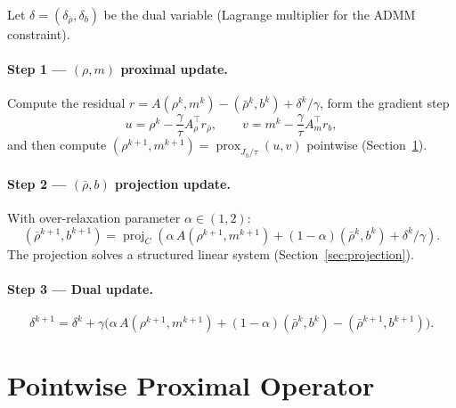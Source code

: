 \documentclass[11pt]{article}
\begin{document}
Let $\delta = (\delta_{\bar\rho}, \delta_b)$ be the dual variable (Lagrange
multiplier for the ADMM constraint).

\paragraph{Step 1 --- $(\rho,m)$ proximal update.}
Compute the residual
$r = A(\rho^k,m^k) - (\bar\rho^k, b^k) + \delta^k/\gamma$,
form the gradient step
\begin{equation}
  u = \rho^k - \frac{\gamma}{\tau}A_\rho^\top r_{\bar\rho}, \qquad
  v = m^k   - \frac{\gamma}{\tau}A_m^\top r_b,
\end{equation}
and then compute $(\rho^{k+1}, m^{k+1}) = \operatorname{prox}_{J_h/\tau}(u, v)$
pointwise (Section~\ref{sec:prox}).

\paragraph{Step 2 --- $(\bar\rho, b)$ projection update.}
With over-relaxation parameter $\alpha \in (1,2)$:
\begin{equation}
  (\bar\rho^{k+1}, b^{k+1})
  = \operatorname{proj}_C\!\left(
      \alpha\,A(\rho^{k+1},m^{k+1}) + (1-\alpha)(\bar\rho^k,b^k)
      + \delta^k/\gamma
    \right).
\end{equation}
The projection solves a structured linear system (Section~\ref{sec:projection}).

\paragraph{Step 3 --- Dual update.}
\begin{equation}
  \delta^{k+1}
  = \delta^k + \gamma\bigl(
      \alpha\,A(\rho^{k+1},m^{k+1}) + (1-\alpha)(\bar\rho^k,b^k)
      - (\bar\rho^{k+1}, b^{k+1})
    \bigr).
\end{equation}

\section{Pointwise Proximal Operator}\label{sec:prox}
\end{document}
